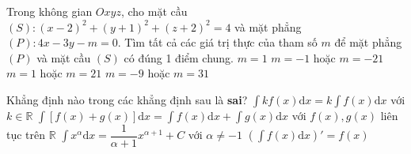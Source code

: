 \begin{ex}%
Trong không gian $Oxyz$, cho mặt cầu $(S)\colon (x-2)^2+(y+1)^2+(z+2)^2=4$ và mặt phẳng $(P)\colon 4x-3y-m=0$. Tìm tất cả các giá trị thực của tham số $m$ để mặt phẳng $(P)$ và mặt cầu $(S)$ có đúng 1 điểm chung.
\choice
{$m=1$}
{$m=-1$ hoặc $m=-21$}
{\True $m=1$ hoặc $m=21$}
{$m=-9$ hoặc $m=31$}
\end{ex}
\begin{ex}%
Khẳng định nào trong các khẳng định sau là \textbf{sai}?
\choice
{\True$\displaystyle\int kf(x)\mathrm{d}x=k\int f(x)\mathrm{d}x$ với $k\in \mathbb{R}$}
{$\displaystyle\int [f(x)+g(x)]\mathrm{d}x=\int{f(x)\mathrm{d}x+\int{g(x)\mathrm{d}x}}$  với $f(x),g(x)$ liên tục trên $\mathbb{R}$}
{$\displaystyle\int x^\alpha \mathrm{d}x=\dfrac{1}{\alpha +1}x^{\alpha +1}+C$  với $\alpha \ne -1$}
{$\displaystyle\left(\int{f(x)\mathrm{d}x}\right)'=f(x)$}
\end{ex}
